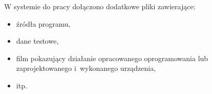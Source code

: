 \documentclass[a4paper,twoside,12pt]{book}
\begin{document}
\begin{appendices}
W systemie do pracy dołączono dodatkowe pliki zawierające:
\begin{itemize}
\item źródła programu,
\item dane testowe,
\item film pokazujący działanie opracowanego oprogramowania lub zaprojektowanego i~wykonanego urządzenia,
\item itp.
\end{itemize}

\listoffigures
{}
\listoftables
{}
	
\end{appendices}
\end{document}

